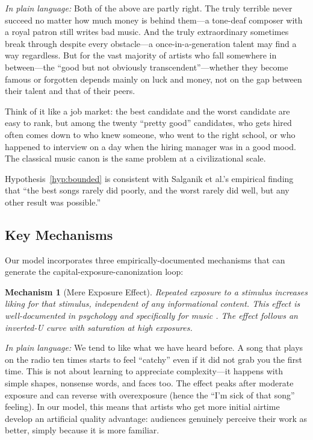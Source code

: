 \documentclass[11pt,a4paper]{article}
\newtheorem{mechanism}{Mechanism}
\begin{document}
\noindent\textit{In plain language:} Both of the above are partly right. The truly terrible never succeed no matter how much money is behind them---a tone-deaf composer with a royal patron still writes bad music. And the truly extraordinary sometimes break through despite every obstacle---a once-in-a-generation talent may find a way regardless. But for the vast majority of artists who fall somewhere in between---the ``good but not obviously transcendent''---whether they become famous or forgotten depends mainly on luck and money, not on the gap between their talent and that of their peers.

Think of it like a job market: the best candidate and the worst candidate are easy to rank, but among the twenty ``pretty good'' candidates, who gets hired often comes down to who knew someone, who went to the right school, or who happened to interview on a day when the hiring manager was in a good mood. The classical music canon is the same problem at a civilizational scale.

Hypothesis~\ref{hyp:bounded} is consistent with Salganik et al.'s empirical finding that ``the best songs rarely did poorly, and the worst rarely did well, but any other result was possible.''

\subsection{Key Mechanisms}

Our model incorporates three empirically-documented mechanisms that can generate the capital-exposure-canonization loop:

\begin{mechanism}[Mere Exposure Effect]
Repeated exposure to a stimulus increases liking for that stimulus, independent of any informational content. This effect is well-documented in psychology \citep{zajonc1968,bornstein1989} and specifically for music \citep{szpunar2004}. The effect follows an inverted-U curve with saturation at high exposures.
\end{mechanism}

\noindent\textit{In plain language:} We tend to like what we have heard before. A song that plays on the radio ten times starts to feel ``catchy'' even if it did not grab you the first time. This is not about learning to appreciate complexity---it happens with simple shapes, nonsense words, and faces too. The effect peaks after moderate exposure and can reverse with overexposure (hence the ``I'm sick of that song'' feeling). In our model, this means that artists who get more initial airtime develop an artificial quality advantage: audiences genuinely perceive their work as better, simply because it is more familiar.
\end{document}
